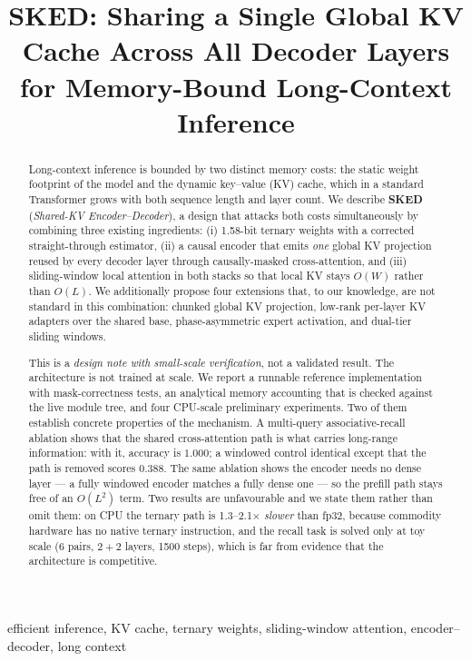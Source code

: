 \documentclass[10pt,conference]{IEEEtran}
\title{SKED: Sharing a Single Global KV Cache Across All Decoder Layers\\ for Memory-Bound Long-Context Inference}
\author{
\IEEEauthorblockN{SKED Project}
\IEEEauthorblockA{\textit{Design note and preliminary measurements}\\
Code: Apache-2.0 \quad|\quad Paper: CC BY 4.0\\
\texttt{https://github.com/3440340143/sked}}
}
\begin{document}
\maketitle

\begin{abstract}
Long-context inference is bounded by two distinct memory costs: the static weight
footprint of the model and the dynamic key--value (KV) cache, which in a standard
Transformer grows with both sequence length and layer count. We describe \textbf{SKED}
(\emph{Shared-KV Encoder--Decoder}), a design that attacks both costs simultaneously by
combining three existing ingredients: (i) 1.58-bit ternary weights with a corrected
straight-through estimator, (ii) a causal encoder that emits \emph{one} global KV
projection reused by every decoder layer through causally-masked cross-attention, and
(iii) sliding-window local attention in both stacks so that local KV stays
$O(W)$ rather than $O(L)$. We additionally propose four extensions that, to our
knowledge, are not standard in this combination: chunked global KV projection,
low-rank per-layer KV adapters over the shared base, phase-asymmetric expert
activation, and dual-tier sliding windows.

This is a \emph{design note with small-scale verification}, not a validated result.
The architecture is not trained at scale. We report a runnable reference
implementation with mask-correctness tests, an analytical memory accounting that is
checked against the live module tree, and four CPU-scale preliminary experiments. Two
of them establish concrete properties of the mechanism. A multi-query associative-recall
ablation shows that the shared cross-attention path is what carries long-range
information: with it, accuracy is $1.000$; a windowed control identical except that the
path is removed scores $0.388$. The same ablation shows the encoder needs no dense
layer --- a fully windowed encoder matches a fully dense one --- so the prefill path
stays free of an $O(L^2)$ term. Two results are unfavourable and we state them rather
than omit them: on CPU the ternary path is 1.3--2.1$\times$ \emph{slower} than fp32,
because commodity hardware has no native ternary instruction, and the recall task is
solved only at toy scale (6 pairs, $2{+}2$ layers, 1500 steps), which is far from
evidence that the architecture is competitive.
\end{abstract}

\begin{IEEEkeywords}
efficient inference, KV cache, ternary weights, sliding-window attention,
encoder--decoder, long context
\end{IEEEkeywords}
\end{document}
